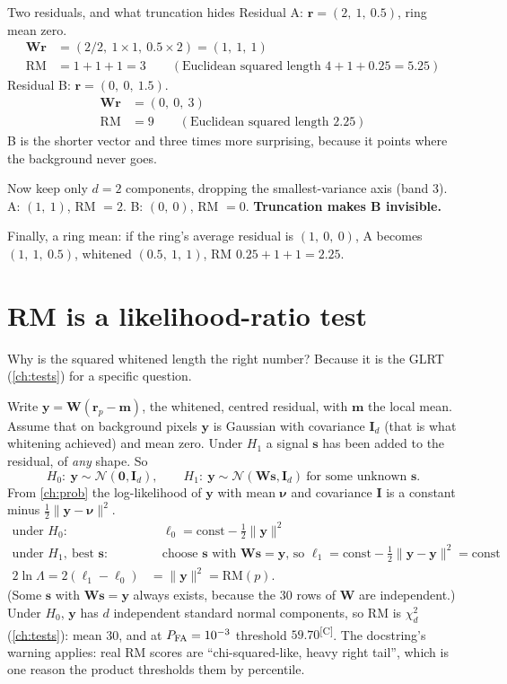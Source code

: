 \documentclass[11pt,a4paper,oneside,openany]{book}
\newcommand{\B}[1]{{\symbf{#1}}}
\newcommand{\B}[1]{{\bm{#1}}}
\newcommand{\comp}{\textsuperscript{\textsf{\scriptsize[C]}}}
\newcommand{\nrm}[1]{\lVert #1\rVert}
\newcommand{\vr}{\B{r}}
\newcommand{\vs}{\B{s}}
\newcommand{\vm}{\B{m}}
\newcommand{\vy}{\B{y}}
\newcommand{\mW}{\B{W}}
\newcommand{\mI}{\B{I}}
\begin{document}
\begin{worked}[label=we:rm3]{Two residuals, and what truncation hides}
Residual A: $\vr=(2,\ 1,\ 0.5)$, ring mean zero.
\begin{align*}
\mW\vr &= (2/2,\ 1\times1,\ 0.5\times2)=(1,\ 1,\ 1)\\
\mathrm{RM} &= 1+1+1=3\qquad(\text{Euclidean squared length } 4+1+0.25=5.25)
\end{align*}
Residual B: $\vr=(0,\ 0,\ 1.5)$.
\begin{align*}
\mW\vr &= (0,\ 0,\ 3)\\
\mathrm{RM} &= 9\qquad(\text{Euclidean squared length } 2.25)
\end{align*}
B is the shorter vector and three times more surprising, because it points where the background never goes.

Now keep only $d=2$ components, dropping the smallest-variance axis (band 3). A: $(1,\ 1)$, RM $=2$. B: $(0,\ 0)$, RM $=0$. \textbf{Truncation
makes B invisible.}

Finally, a ring mean: if the ring's average residual is $(1,\ 0,\ 0)$, A becomes $(1,\ 1,\ 0.5)$, whitened $(0.5,\ 1,\ 1)$, RM
$0.25+1+1=2.25$.
\end{worked}

\section{RM is a likelihood-ratio test}

Why is the squared whitened length the right number? Because it is the GLRT (\cref{ch:tests}) for a specific question.

Write $\vy=\mW(\vr_p-\vm)$, the whitened, centred residual, with $\vm$ the local mean. Assume that on background pixels $\vy$ is
Gaussian with covariance $\mI_d$ (that is what whitening achieved) and mean zero. Under $H_1$ a signal $\vs$ has been added to the
residual, of \emph{any} shape. So
\[
  H_0:\ \vy\sim\mathcal N(\B0,\mI_d),\qquad H_1:\ \vy\sim\mathcal N(\mW\vs,\mI_d)\ \text{for some unknown }\vs .
\]
From \cref{ch:prob} the log-likelihood of $\vy$ with mean $\B\nu$ and covariance $\mI$ is a constant minus $\frac12\nrm{\vy-\B\nu}^2$.
\begin{align*}
\text{under }H_0: &\quad \ell_0=\text{const}-\tfrac12\nrm{\vy}^2\\
\text{under }H_1,\ \text{best }\vs: &\quad \text{choose }\vs\text{ with }\mW\vs=\vy\text{, so }\ell_1=\text{const}-\tfrac12\nrm{\vy-\vy}^2=\text{const}\\
2\ln\Lambda=2(\ell_1-\ell_0) &= \nrm{\vy}^2=\mathrm{RM}(p).
\end{align*}
(Some $\vs$ with $\mW\vs=\vy$ always exists, because the 30 rows of $\mW$ are independent.) Under $H_0$, $\vy$ has $d$ independent standard
normal components, so RM is $\chi^2_d$ (\cref{ch:tests}): mean 30, and at $P_{\rm FA}=10^{-3}$ threshold $59.70$\comp. The docstring's
warning applies: real RM scores are ``chi-squared-like, heavy right tail'', which is one reason the product thresholds them by percentile.
\end{document}
